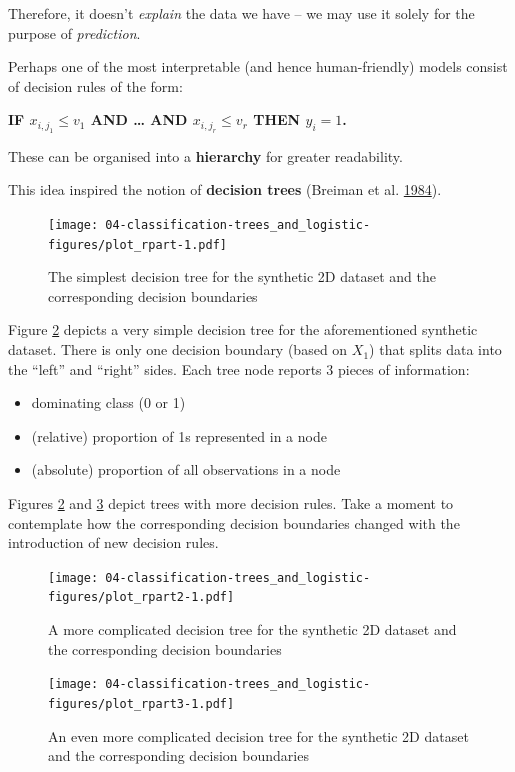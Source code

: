 \documentclass[10pt,b5paper,krantz1]{krantz}
\providecommand{\tightlist}{%
  \setlength{\itemsep}{0pt}\setlength{\parskip}{0pt}}
\begin{document}
Therefore, it doesn't \emph{explain} the data we have -- we may use it solely
for the purpose of \emph{prediction}.

Perhaps one of the most interpretable (and hence human-friendly) models
consist of decision rules of the form:

\textbf{IF \(x_{i,j_1}\le v_1\) AND \ldots{} AND \(x_{i,j_r}\le v_r\) THEN \(\hat{y}_i=1\).}

These can be organised into a \textbf{hierarchy} for greater readability.

This idea inspired the notion of \textbf{decision trees} (Breiman et al. \protect\hyperlink{ref-cart}{1984}).

\begin{figure}
\hypertarget{fig:plot_rpart}{%
\centering
\texttt{[image: 04-classification-trees\_and\_logistic-figures/plot\_rpart-1.pdf]}
\caption{The simplest decision tree for the synthetic 2D dataset and the corresponding decision boundaries}\label{fig:plot_rpart}
}
\end{figure}

Figure \ref{fig:plot_rpart2} depicts a very simple decision tree
for the aforementioned synthetic dataset.
There is only one decision boundary (based on \(X_1\)) that splits
data into the ``left'' and ``right'' sides.
Each tree node reports 3 pieces of information:

\begin{itemize}
\tightlist
\item
  dominating class (0 or 1)
\item
  (relative) proportion of 1s represented in a node
\item
  (absolute) proportion of all observations in a node
\end{itemize}

Figures \ref{fig:plot_rpart2} and \ref{fig:plot_rpart3} depict
trees with more decision rules.
Take a moment to contemplate how the corresponding decision boundaries
changed with the introduction of new decision rules.

\begin{figure}
\hypertarget{fig:plot_rpart2}{%
\centering
\texttt{[image: 04-classification-trees\_and\_logistic-figures/plot\_rpart2-1.pdf]}
\caption{A more complicated decision tree for the synthetic 2D dataset and the corresponding decision boundaries}\label{fig:plot_rpart2}
}
\end{figure}

\begin{figure}
\hypertarget{fig:plot_rpart3}{%
\centering
\texttt{[image: 04-classification-trees\_and\_logistic-figures/plot\_rpart3-1.pdf]}
\caption{An even more complicated decision tree for the synthetic 2D dataset and the corresponding decision boundaries}\label{fig:plot_rpart3}
}
\end{figure}
\end{document}
